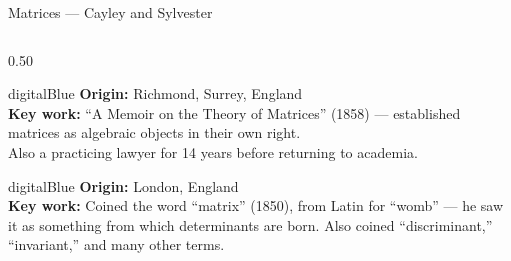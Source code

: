 \begin{frame}[shrink=11]{Matrices --- Cayley and Sylvester}

  \begin{columns}[T]
    \begin{column}{0.50\textwidth}
      \begin{personbox}{digitalBlue}
        \small
        \textbf{Origin:} Richmond, Surrey, England\\
        \textbf{Key work:} ``A Memoir on the Theory of Matrices'' (1858) ---
        established matrices as algebraic objects in their own right.\\
        Also a practicing lawyer for 14 years before returning to academia.
      \end{personbox}

      \vspace{0.3em}
      \begin{personbox}{digitalBlue}
        \small
        \textbf{Origin:} London, England\\
        \textbf{Key work:} Coined the word ``matrix'' (1850), from Latin for
        ``womb'' --- he saw it as something from which determinants are born.
        Also coined ``discriminant,'' ``invariant,'' and many other terms.
      \end{personbox}
    \end{column}


\end{columns}
\end{frame}
